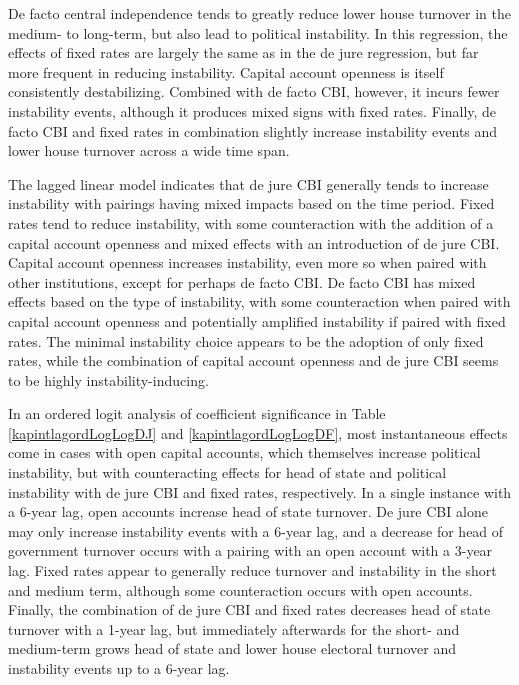 \documentclass{article}
\begin{document}
    De facto central independence tends to greatly reduce lower house turnover in the medium- to long-term, but also lead to political instability. In this regression, the effects of fixed rates are largely the same as in the de jure regression, but far more frequent in reducing instability. Capital account openness is itself consistently destabilizing. Combined with de facto CBI, however, it incurs fewer instability events, although it produces mixed signs with fixed rates. Finally, de facto CBI and fixed rates in combination slightly increase instability events and lower house turnover across a wide time span.

    The lagged linear model indicates that de jure CBI generally tends to increase instability with pairings having mixed impacts based on the time period. Fixed rates tend to reduce instability, with some counteraction with the addition of a capital account openness and mixed effects with an introduction of de jure CBI. Capital account openness increases instability, even more so when paired with other institutions, except for perhaps de facto CBI. De facto CBI has mixed effects based on the type of instability, with some counteraction when paired with capital account openness and potentially amplified instability if paired with fixed rates. The minimal instability choice appears to be the adoption of only fixed rates, while the combination of capital account openness and de jure CBI seems to be highly instability-inducing.

    In an ordered logit analysis of coefficient significance in Table \ref*{kapintlagordLogLogDJ} and \ref*{kapintlagordLogLogDF}, most instantaneous effects come in cases with open capital accounts, which themselves increase political instability, but with counteracting effects for head of state and political instability with de jure CBI and fixed rates, respectively. In a single instance with a 6-year lag, open accounts increase head of state turnover. De jure CBI alone may only increase instability events with a 6-year lag, and a decrease for head of government turnover occurs with a pairing with an open account with a 3-year lag. Fixed rates appear to generally reduce turnover and instability in the short and medium term, although some counteraction occurs with open accounts. Finally, the combination of de jure CBI and fixed rates decreases head of state turnover with a 1-year lag, but immediately afterwards for the short- and medium-term grows head of state and lower house electoral turnover and instability events up to a 6-year lag.
\end{document}
